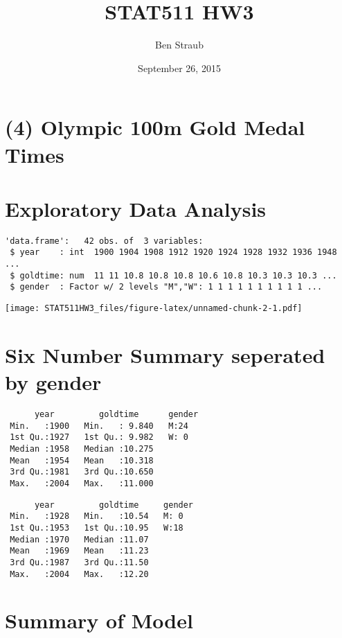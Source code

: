\documentclass[]{article}
\title{STAT511 HW3}
\author{Ben Straub}
\date{September 26, 2015}
\begin{document}
\maketitle


\section{(4) Olympic 100m Gold Medal
Times}\label{olympic-100m-gold-medal-times}

\section{Exploratory Data Analysis}\label{exploratory-data-analysis}

\begin{verbatim}
'data.frame':   42 obs. of  3 variables:
 $ year    : int  1900 1904 1908 1912 1920 1924 1928 1932 1936 1948 ...
 $ goldtime: num  11 11 10.8 10.8 10.8 10.6 10.8 10.3 10.3 10.3 ...
 $ gender  : Factor w/ 2 levels "M","W": 1 1 1 1 1 1 1 1 1 1 ...
\end{verbatim}

\texttt{[image: STAT511HW3\_files/figure-latex/unnamed-chunk-2-1.pdf]}

\section{Six Number Summary seperated by
gender}\label{six-number-summary-seperated-by-gender}

\begin{verbatim}
      year         goldtime      gender
 Min.   :1900   Min.   : 9.840   M:24  
 1st Qu.:1927   1st Qu.: 9.982   W: 0  
 Median :1958   Median :10.275         
 Mean   :1954   Mean   :10.318         
 3rd Qu.:1981   3rd Qu.:10.650         
 Max.   :2004   Max.   :11.000         
\end{verbatim}

\begin{verbatim}
      year         goldtime     gender
 Min.   :1928   Min.   :10.54   M: 0  
 1st Qu.:1953   1st Qu.:10.95   W:18  
 Median :1970   Median :11.07         
 Mean   :1969   Mean   :11.23         
 3rd Qu.:1987   3rd Qu.:11.50         
 Max.   :2004   Max.   :12.20         
\end{verbatim}

\section{Summary of Model}\label{summary-of-model}
\end{document}
